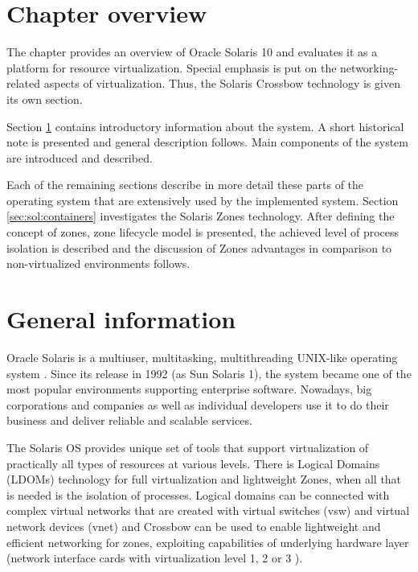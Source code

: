 \documentclass[11pt]{book}
\begin{document}
    \section*{Chapter overview}

      The chapter provides an overview of Oracle Solaris 10 and evaluates it as a platform for resource virtualization.
      Special emphasis is put on the networking-related aspects of virtualization. Thus, the Solaris Crossbow technology
      is given its own section.

      Section \ref{sec:sol:general} contains introductory information about the system. A short historical note is
      presented and general description follows. Main components of the system are introduced and described.
      
      Each of the remaining sections describe in more detail these parts of the operating system that are extensively
      used by the implemented system. Section \ref{sec:sol:containers} investigates the Solaris Zones technology. After
      defining the concept of zones, zone lifecycle model is presented, the achieved level of process isolation
      is described and the discussion of Zones advantages in comparison to non-virtualized environments follows.




    \section{General information}
    \label{sec:sol:general}

      Oracle Solaris is a multiuser, multitasking, multithreading UNIX-like operating system \cite{reference}. Since its
      release in 1992 (as Sun Solaris 1), the system became one of the most popular environments supporting
      enterprise software. Nowadays, big corporations and companies as well as individual developers use it to do
      their business and deliver reliable and scalable services.

      The Solaris OS provides unique set of tools that support virtualization of practically all types of resources at
      various levels. There is Logical Domains (LDOMs) technology for full virtualization and lightweight Zones, when
      all that is needed is the isolation of processes. Logical domains can be connected with complex virtual networks
      that are created with virtual switches (vsw) and virtual network devices (vnet) \cite{ldomag} and Crossbow can be
      used to enable lightweight and efficient networking for zones, exploiting capabilities of underlying hardware
      layer (network interface cards with virtualization level 1, 2 or 3 \cite{santos}).
\end{document}
